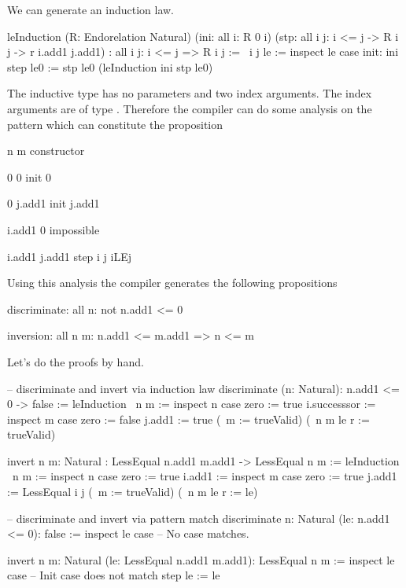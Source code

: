 We can generate an induction law.
\begin{alba}
    leInduction
        (R: Endorelation Natural)
        (ini: all i: R 0 i)
        (stp: all i j: i <= j -> R i j -> r i.add1 j.add1)
        : all {i j}: i <= j => R i j
    :=
        \ i j le :=
            inspect le case
                init: ini
                step le0 := stp le0 (leInduction ini stp le0)
\end{alba}

The inductive type has no parameters and two index arguments. The index
arguments are of type . Therefore the compiler can do some analysis
on the pattern which can constitute the proposition 

\begin{alba}
        n               m                   constructor

        0               0                   init 0

        0               j.add1         init j.add1

        i.add1     0                   impossible

        i.add1     j.add1         step i j iLEj
\end{alba}
%
Using this analysis the compiler generates the following propositions
\begin{alba}
    discriminate: all n: not n.add1 <= 0

    inversion: all n m: n.add1 <= m.add1 => n <= m
\end{alba}

Let's do the proofs by hand.

\begin{alba}
    -- discriminate and invert via induction law
    discriminate (n: Natural): n.add1 <= 0 -> false :=
        leInduction
            {\ n m :=
                inspect n case
                    zero := true
                    i.successsor :=
                        inspect m case
                            zero := false
                            j.add1 := true}
            (\ m := trueValid)
            (\ n m le r := trueValid)


    invert {n m: Natural}
        : LessEqual n.add1 m.add1 -> LessEqual n m
    :=
        leInduction
            {\ n m :=
                inspect n case
                    zero := true
                    i.add1 :=
                        inspect m case
                            zero := true
                            j.add1 :=
                                LessEqual i j}
            (\ m := trueValid)
            (\ n m le r := le)


    -- discriminate and invert via pattern match
    discriminate {n: Natural} (le: n.add1 <= 0): false :=
        inspect le case
            -- No case matches.

    invert {n m: Natural} (le: LessEqual n.add1 m.add1): LessEqual n m
    :=
        inspect le case
            -- Init case does not match
            step le := le
\end{alba}




